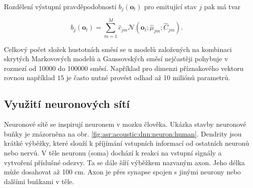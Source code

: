 


\noindent Rozdělení výstupní pravděpodobnosti $b_j\left(\boldsymbol{o}_t\right)$ pro emitující stav $j$ pak má tvar

\begin{equation}
   b_{j}\left(\boldsymbol{o}_t\right) = \sum_{m=1}^{M} \hat{c}_{jm} \mathcal{N}\left(\boldsymbol{o}_t; \hat{\mu}_{jm}; \hat{C}_{jm}\right).
   \label{eq:asr:acoustic:gmm:output}
 \end{equation}

\noindent Celkový počet složek hustotních směsí se u modelů založených na kombinaci skrytých Markovových modelů a Gaussovských směsí nejčastěji pohybuje v rozmezí od 10000 do 100000 směsí. Například pro dimenzi příznakového vektoru rovnou například $15$ je často nutné provést odhad až 10 miliónů parametrů.

\subsection{Využití neuronových sítí}
\label{chap:asr:acoustic:DNN}

Neuronové sítě se inspirují neuronem v mozku člověka. Ukázka stavby neuronové buňky je znázorněna na obr. \ref{fig:asr:acoustic:dnn:neuron:human}. Dendrity jsou krátké výběžky, které slouží k příjímání vstupních informací od ostatních neuronů nebo nervů. V těle neuronu (soma) dochází k reakci na vstupní signály a vytvoření příslušné odezvy. Ta se dále šíří výběžkem nazvaným axon. Jeho délka může dosahovat až 100 cm. Axon je přes synapse spojen s jinými neurony nebo dalšími buňkami v těle.

